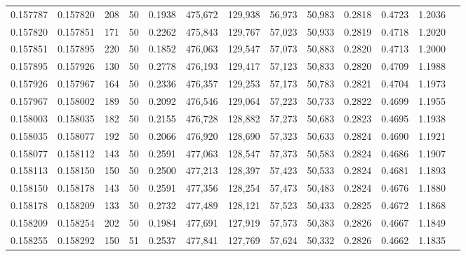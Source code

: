\begin{tabular}{rrrrrrrrrrrrr}
0.157787 & 0.157820 &   208 &  50 &                                     0.1938 & 475,672 & 129,938 &  56,973 &  50,983 & 0.2818 & 0.4723 & 1.2036 \\
0.157820 & 0.157851 &   171 &  50 &                                     0.2262 & 475,843 & 129,767 &  57,023 &  50,933 & 0.2819 & 0.4718 & 1.2020 \\
0.157851 & 0.157895 &   220 &  50 &                                     0.1852 & 476,063 & 129,547 &  57,073 &  50,883 & 0.2820 & 0.4713 & 1.2000 \\
0.157895 & 0.157926 &   130 &  50 &                                     0.2778 & 476,193 & 129,417 &  57,123 &  50,833 & 0.2820 & 0.4709 & 1.1988 \\
0.157926 & 0.157967 &   164 &  50 &                                     0.2336 & 476,357 & 129,253 &  57,173 &  50,783 & 0.2821 & 0.4704 & 1.1973 \\
0.157967 & 0.158002 &   189 &  50 &                                     0.2092 & 476,546 & 129,064 &  57,223 &  50,733 & 0.2822 & 0.4699 & 1.1955 \\
0.158003 & 0.158035 &   182 &  50 &                                     0.2155 & 476,728 & 128,882 &  57,273 &  50,683 & 0.2823 & 0.4695 & 1.1938 \\
0.158035 & 0.158077 &   192 &  50 &                                     0.2066 & 476,920 & 128,690 &  57,323 &  50,633 & 0.2824 & 0.4690 & 1.1921 \\
0.158077 & 0.158112 &   143 &  50 &                                     0.2591 & 477,063 & 128,547 &  57,373 &  50,583 & 0.2824 & 0.4686 & 1.1907 \\
0.158113 & 0.158150 &   150 &  50 &                                     0.2500 & 477,213 & 128,397 &  57,423 &  50,533 & 0.2824 & 0.4681 & 1.1893 \\
0.158150 & 0.158178 &   143 &  50 &                                     0.2591 & 477,356 & 128,254 &  57,473 &  50,483 & 0.2824 & 0.4676 & 1.1880 \\
0.158178 & 0.158209 &   133 &  50 &                                     0.2732 & 477,489 & 128,121 &  57,523 &  50,433 & 0.2825 & 0.4672 & 1.1868 \\
0.158209 & 0.158254 &   202 &  50 &                                     0.1984 & 477,691 & 127,919 &  57,573 &  50,383 & 0.2826 & 0.4667 & 1.1849 \\
0.158255 & 0.158292 &   150 &  51 &                                     0.2537 & 477,841 & 127,769 &  57,624 &  50,332 & 0.2826 & 0.4662 & 1.1835 \\

\end{tabular}
